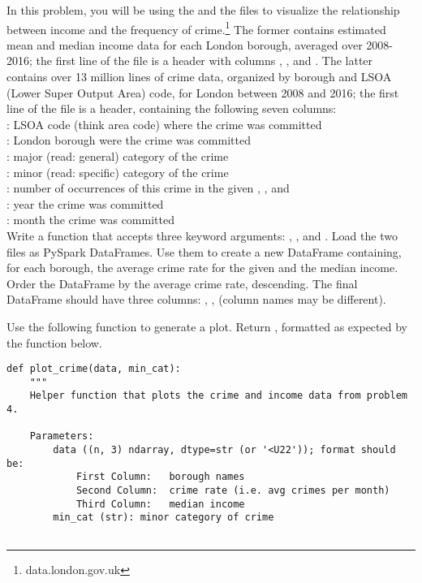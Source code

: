\begin{problem}
In this problem, you will be using the  and the  files to visualize the relationship between income and the frequency of crime.\footnote{data.london.gov.uk} 
The former contains estimated mean and median income data for each London borough, averaged over 2008-2016; 
the first line of the file is a header with columns , , and . 
The latter contains over 13 million lines of crime data, organized by borough and LSOA (Lower Super Output Area) code, for London between 2008 and 2016;
the first line of the file is a header, containing the following seven columns:\\

: LSOA code (think area code) where the crime was committed\\
\indent{}: London borough were the crime was committed\\
\indent{}: major (read: general) category of the crime\\
\indent{}: minor (read: specific) category of the crime\\
\indent{}: number of occurrences of this crime in the given , , and \\
\indent{}: year the crime was committed\\
\indent{}: month the crime was committed\\

Write a function that accepts three keyword arguments: , , and . Load the two files as PySpark DataFrames. Use them to create a new DataFrame containing, for each borough, the average crime rate for the given  and the median income. Order the DataFrame by the average crime rate, descending. The final DataFrame should have three columns: , ,  (column names may be different).

Use the following function to generate a plot. Return , formatted as expected by the function below.
\begin{lstlisting}
def plot_crime(data, min_cat):
    """
    Helper function that plots the crime and income data from problem 4.
    
    Parameters:
        data ((n, 3) ndarray, dtype=str (or '<U22')); format should be:
            First Column:   borough names
            Second Column:  crime rate (i.e. avg crimes per month)
            Third Column:   median income
        min_cat (str): minor category of crime 
        

\end{lstlisting}
\end{problem}
